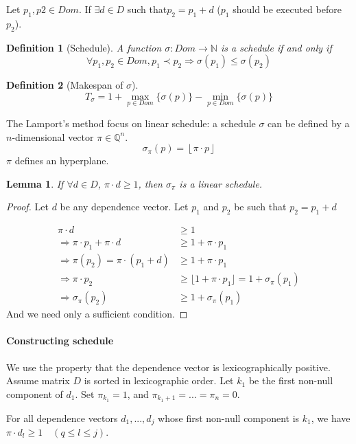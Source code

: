 \documentclass{article}
\newtheorem{lemma}{Lemma}
\newtheorem{defi}{Definition}
\begin{document}
Let $p_1,p2 \in Dom$. If $\exists d \in D$ such that$p_2=p_1 + d$ ($p_1$ should be executed before $p_2$).

\begin{defi}[Schedule]
A function $\sigma : Dom \to \mathbb{N}$ is a schedule if and only if
\[\forall p_1,p_2 \in Dom, p_1\prec p_2 \Rightarrow \sigma(p_1)\leq \sigma(p_2)\]
\end{defi}

\begin{defi}[Makespan of $\sigma$]
\[T_{\sigma}=1+\max_{p\in Dom} \{ \sigma(p)\} - \min_{p\in Dom}\{ \sigma(p)\}\]
\end{defi}

The Lamport's method focus on linear schedule: a schedule $\sigma$ can be defined by a $n$-dimensional vector $\pi \in \mathbb{Q}^n$.
\[\sigma_\pi(p) = \left\lfloor \pi \cdot p \right\rfloor\]
$\pi$ defines an hyperplane.

\begin{lemma}
If $\forall d\in D$, $\pi\cdot d \geq 1$, then $\sigma_\pi$ is a linear schedule.
\end{lemma}

\begin{proof}
Let $d$ be any dependence vector. Let $p_1$ and $p_2$ be such that $p_2=p_1+d$

\begin{align*}
\pi \cdot d & \geq 1\\
\Rightarrow \pi\cdot p_1 + \pi \cdot d & \geq 1 + \pi \cdot p_1\\
\Rightarrow \pi(p_2)=\pi\cdot(p_1+d) & \geq 1 + \pi \cdot p_1\\
\Rightarrow \pi\cdot p_2 & \geq \lfloor 1 + \pi \cdot p_1 \rfloor = 1 + \sigma_\pi(p_1)\\
\Rightarrow \sigma_\pi(p_2) & \geq 1 + \sigma_\pi(p_1)
\end{align*}
And we need only a sufficient condition.
\end{proof}

\paragraph{Constructing schedule}
We use the property that the dependence vector is lexicographically positive. Assume matrix $D$ is sorted in lexicographic order. Let $k_1$ be the first non-null component of $d_1$. Set $\pi_{k_1}=1$, and $\pi_{k_{1}+1}=...=\pi_n=0$.

For all dependence vectors $d_1,...,d_j$ whose first non-null component is $k_1$, we have $\pi \cdot d_l \geq 1\quad (q\leq l \leq j)$.
\end{document}
